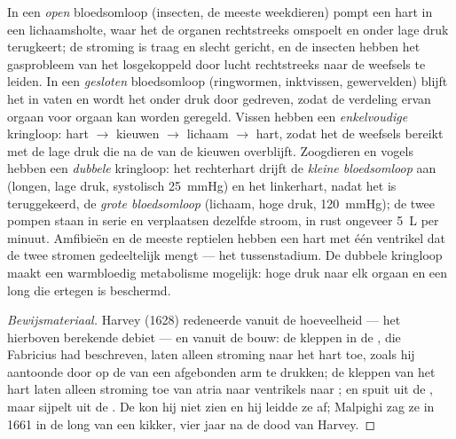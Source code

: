 \begin{definition}\label{def:b2:blood-circulation:circuits}
In een \emph{open} bloedsomloop (insecten, de meeste weekdieren) pompt een
hart  in een lichaamsholte, waar het de organen rechtstreeks omspoelt
en onder lage druk terugkeert; de stroming is traag en slecht gericht, en
de insecten hebben het gasprobleem van het  losgekoppeld door lucht
rechtstreeks naar de weefsels te leiden. In een \emph{gesloten} bloedsomloop
(ringwormen, inktvissen, gewervelden) blijft het  in vaten en wordt
het onder druk door  gedreven, zodat de verdeling ervan orgaan
voor orgaan kan worden geregeld. Vissen hebben een \emph{enkelvoudige}
kringloop: hart
$\to$ kieuwen $\to$ lichaam $\to$ hart, zodat het  de weefsels bereikt
met de lage druk die na de  van de kieuwen overblijft. Zoogdieren
en vogels hebben een \emph{dubbele} kringloop: het rechterhart drijft de
\emph{kleine bloedsomloop} aan (longen, lage druk, systolisch
\qty{25}{mmHg}) en het linkerhart, nadat het  is teruggekeerd, de
\emph{grote bloedsomloop} (lichaam, hoge druk, \qty{120}{mmHg});
de twee pompen staan in serie en verplaatsen dezelfde stroom, in rust
ongeveer \qty{5}{L} per minuut. Amfibieën en de meeste reptielen hebben een
hart met één ventrikel dat de twee stromen gedeeltelijk mengt --- het
tussenstadium. De dubbele kringloop maakt een warmbloedig metabolisme
mogelijk: hoge druk naar elk orgaan en een long die ertegen is beschermd.
\end{definition}
\begin{proof}[Bewijsmateriaal]
Harvey (1628) redeneerde vanuit de hoeveelheid --- het hierboven berekende
debiet --- en vanuit de bouw: de kleppen in de , die Fabricius had
beschreven, laten alleen stroming naar het hart toe, zoals hij aantoonde door
op de  van een afgebonden arm te drukken; de kleppen van het hart laten
alleen stroming toe van atria naar ventrikels naar ; en  spuit uit
de , maar sijpelt uit de . De  kon hij niet zien en hij
leidde ze af; Malpighi zag ze in 1661 in de long van een kikker, vier jaar
na de dood van Harvey.
\end{proof}

